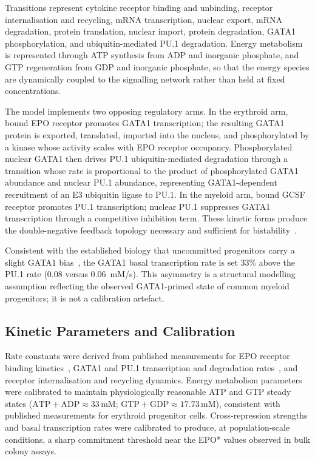 Transitions represent cytokine receptor binding and unbinding, receptor
internalisation and recycling, mRNA transcription, nuclear export, mRNA
degradation, protein translation, nuclear import, protein degradation, GATA1
phosphorylation, and ubiquitin-mediated PU.1 degradation. Energy metabolism is
represented through ATP synthesis from ADP and inorganic phosphate, and GTP
regeneration from GDP and inorganic phosphate, so that the energy species are
dynamically coupled to the signalling network rather than held at fixed
concentrations.

The model implements two opposing regulatory arms. In the erythroid arm, bound
EPO receptor promotes GATA1 transcription; the resulting GATA1 protein is
exported, translated, imported into the nucleus, and phosphorylated by a kinase
whose activity scales with EPO receptor occupancy. Phosphorylated nuclear GATA1
then drives PU.1 ubiquitin-mediated degradation through a transition whose rate
is proportional to the product of phosphorylated GATA1 abundance and nuclear PU.1
abundance, representing GATA1-dependent recruitment of an E3 ubiquitin ligase to
PU.1. In the myeloid arm, bound GCSF receptor promotes PU.1 transcription;
nuclear PU.1 suppresses GATA1 transcription through a competitive inhibition term.
These kinetic forms produce the double-negative feedback topology necessary and
sufficient for bistability~\cite{huang2007}.

Consistent with the established biology that uncommitted progenitors carry a
slight GATA1 bias~\cite{cantor2002}, the GATA1 basal transcription rate is set
33\% above the PU.1 rate (0.08 versus 0.06~mM/s). This asymmetry is a structural
modelling assumption reflecting the observed GATA1-primed state of common myeloid
progenitors; it is not a calibration artefact.

\subsection{Kinetic Parameters and Calibration}
\label{sec:calibration}

Rate constants were derived from published measurements for EPO receptor binding
kinetics~\cite{huang2007}, GATA1 and PU.1 transcription and degradation
rates~\cite{chickarmane2009}, and receptor internalisation and recycling dynamics.
Energy metabolism parameters were calibrated to maintain physiologically
reasonable ATP and GTP steady states
($\text{ATP}+\text{ADP} \approx 33\,\text{mM}$;
$\text{GTP}+\text{GDP} \approx 17.73\,\text{mM}$), consistent with published measurements for
erythroid progenitor cells. Cross-repression strengths and basal transcription
rates were calibrated to produce, at population-scale conditions, a sharp
commitment threshold near the EPO* values observed in bulk colony assays.

